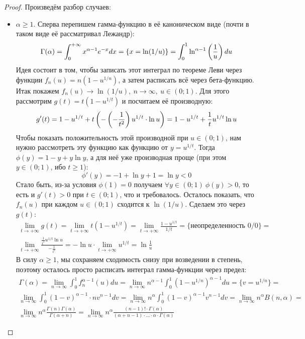\begin{proof}
	Произведём разбор случаев:
	\begin{itemize}
		\item $\alpha \ge 1$. Сперва перепишем гамма-функцию в её каноническом виде (почти в таком виде её рассматривал Лежандр):
		\[
			\Gamma(\alpha) = \int_0^{+\infty} x^{\alpha - 1}e^{-x}dx = \{x = \ln(1 / u)\} = \int_0^1 \ln^{\alpha - 1} \left(\frac{1}{u}\right)du
		\]
		Идея состоит в том, чтобы записать этот интеграл по теореме Леви через функции $f_n(u) = n(1 - u^{1 / n})$, а затем расписать всё через бета-функцию. Итак покажем $f_n(u) \to \ln(1 / u),\ n \to \infty,\ u \in (0; 1)$. Для этого рассмотрим $g(t) = t(1 - u^{1 / t})$ и посчитаем её производную:
		\[
			g'(t) = 1 - u^{1 / t} + t\left(-\left(-\frac{1}{t^2}\right)u^{1 / t} \cdot \ln u\right) = 1 - u^{1 / t} + \frac{1}{t}u^{1 / t}\ln u
		\]
		Чтобы показать положительность этой производной при $u \in (0; 1)$, нам нужно рассмотреть эту функцию как функцию от $y = u^{1 / t}$. Тогда $\phi(y) = 1 - y + y\ln y$, а для неё уже производная проще (при этом $y \in (0; 1)$, ибо $t \ge 1$):
		\[
			\phi'(y) = -1 + \ln y + 1 = \ln y < 0
		\]
		Стало быть, из-за условия $\phi(1) = 0$ получаем $\forall y \in (0; 1)\ \phi(y) > 0$, то есть и $g'(t) > 0$ при $t \in (0; 1)$, что и требовалось. Осталось показать, что $f_n(u)$ при каждом $u \in (0; 1)$ сходится к $\ln(1 / u)$. Сделаем это через $g(t)$:
		\begin{multline*}
			\lim_{t \to +\infty} g(t) = \lim_{t \to +\infty} t(1 - u^{1 / t}) = \lim_{t \to +\infty} \frac{1 - u^{1 / t}}{1 / t} = \{\text{неопределенность } 0 / 0\} =
			\\
			\lim_{t \to +\infty} \frac{\frac{1}{t^2}u^{1 / t}\ln u}{-\frac{1}{t^2}} = -\ln u \cdot \lim_{t \to +\infty} u^{1 / t} = \ln \frac{1}{u}
		\end{multline*}
		В силу $\alpha \ge 1$, мы сохраняем сходимость снизу при возведении в степень, поэтому осталось просто расписать интеграл гамма-функции через предел:
		\begin{multline*}
			\Gamma(\alpha) = \lim_{n \to \infty} \int_0^1 f_n^{\alpha - 1}(u)du = \lim_{n \to \infty} n^{\alpha - 1} \int_0^1 (1 - u^{1 / n})^{\alpha - 1}du = \{v = u^{1 / n}\} =
			\\
			\lim_{n \to \infty} \int_0^1 (1 - v)^{\alpha - 1} \cdot nv^{n - 1}dv = \lim_{n \to \infty} n^\alpha \int_0^1 (1 - v)^{\alpha - 1}v^{n - 1}dv = \lim_{n \to \infty} n^\alpha B(n, \alpha) =
			\\
			\lim_{n \to \infty} n^\alpha \frac{\Gamma(n)\Gamma(\alpha)}{\Gamma(\alpha + n)} = \lim_{n \to \infty} n^\alpha\frac{(n - 1)! \cdot \Gamma(\alpha)}{(\alpha + n - 1) \cdot \ldots \cdot \alpha \cdot \Gamma(\alpha)}
		\end{multline*}
		

\end{itemize}
\end{proof}
